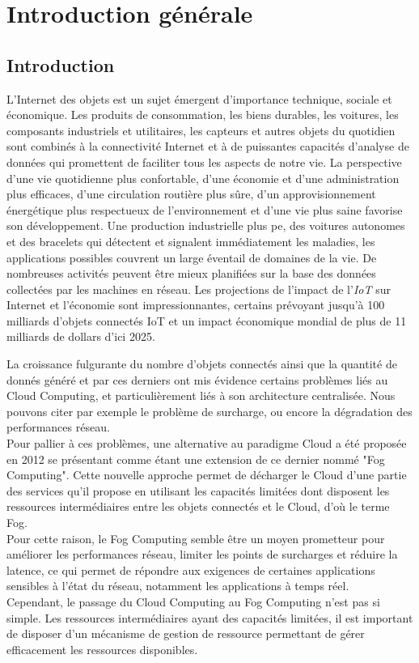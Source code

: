 \chapter{Introduction générale}
\thispagestyle{empty}
\newpage
\section{Introduction}
\par L'Internet des objets est un sujet émergent d'importance technique, sociale et économique. Les produits de consommation, les biens durables, les voitures, les composants industriels et utilitaires, les capteurs et autres objets du quotidien sont combinés à la connectivité Internet et à de puissantes capacités d'analyse de données qui promettent de faciliter tous les aspects de notre vie. La perspective d’une vie quotidienne plus confortable, d’une économie et d’une administration plus efficaces, d'une circulation routière plus sûre, d’un approvisionnement énergétique plus respectueux de l'environnement et d’une vie plus saine favorise son développement. Une production industrielle plus pe, des voitures autonomes et des bracelets qui détectent et signalent immédiatement les maladies, les applications possibles couvrent un large éventail de domaines de la vie. De nombreuses activités peuvent être mieux planifiées sur la base des données collectées par les machines en réseau. Les projections de l'impact de l'\emph{IoT} sur Internet et l'économie sont impressionnantes, certains prévoyant jusqu'à 100 milliards d'objets connectés IoT et un impact économique mondial de plus de 11 milliards de dollars d'ici 2025. \par
La croissance fulgurante du nombre d'objets connectés ainsi que la quantité de donnés généré et par ces derniers ont mis évidence certains problèmes liés au Cloud Computing, et particulièrement liés à son architecture centralisée. Nous pouvons citer par exemple le problème de surcharge, ou encore la dégradation des performances réseau.\\
Pour pallier à ces problèmes, une alternative au paradigme Cloud a été proposée en 2012 se présentant comme étant une extension de ce dernier nommé "Fog Computing". Cette nouvelle approche permet de décharger le Cloud d'une partie des services qu'il propose en utilisant les capacités limitées dont disposent les ressources intermédiaires entre les objets connectés et le Cloud, d'où le terme Fog.\\ 
Pour cette raison, le Fog Computing semble être un moyen prometteur pour améliorer les performances réseau, limiter les points de surcharges et réduire la latence, ce qui permet de répondre aux exigences de certaines applications sensibles à l'état du réseau, notamment les applications à temps réel.\\
Cependant, le passage du Cloud Computing au Fog Computing n’est pas si simple. Les ressources
intermédiaires ayant des capacités limitées, il est important de disposer d'un mécanisme de gestion de ressource permettant de gérer efficacement les ressources disponibles.
